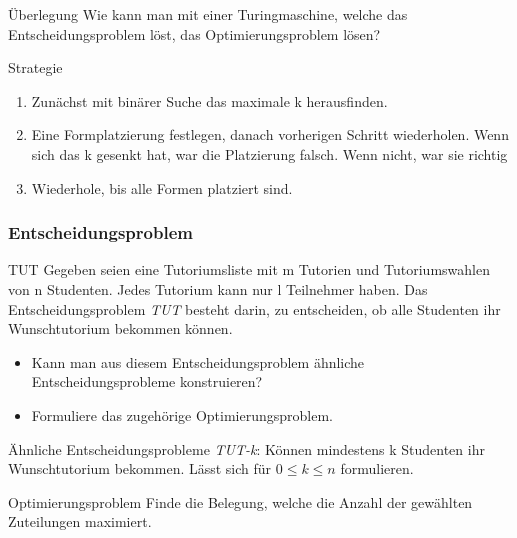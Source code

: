 \documentclass{beamer}
\begin{document}
{\begin{frame}
 \begin{block}{Überlegung}
  Wie kann man mit einer Turingmaschine, welche das Entscheidungsproblem löst, das Optimierungsproblem lösen?
 \end{block}
\begin{block}{Strategie}
 \begin{enumerate}
  \item Zunächst mit binärer Suche das maximale k herausfinden.
  \item Eine Formplatzierung festlegen, danach vorherigen Schritt wiederholen. Wenn sich das k gesenkt hat, war die Platzierung falsch. 
  Wenn nicht, war sie richtig
  \item Wiederhole, bis alle Formen platziert sind.
 \end{enumerate}
\end{block}
\end{frame}



\begin{frame}
 \frametitle{Entscheidungsproblem}
 \begin{block}{TUT}
  Gegeben seien eine Tutoriumsliste mit m Tutorien und Tutoriumswahlen von n Studenten. Jedes Tutorium kann nur l Teilnehmer haben.
 Das Entscheidungsproblem \textit{TUT} besteht darin, zu entscheiden, ob alle Studenten ihr Wunschtutorium bekommen können.
 \end{block}
 \begin{itemize}
  \item Kann man aus diesem Entscheidungsproblem ähnliche Entscheidungsprobleme konstruieren?
  \item Formuliere das zugehörige Optimierungsproblem.
 \end{itemize}
\end{frame}

\begin{frame}
 \begin{block}{Ähnliche Entscheidungsprobleme}
  \textit{TUT-k}: Können mindestens k Studenten ihr Wunschtutorium bekommen.
  Lässt sich für $0 \leq k \leq n$ formulieren.
 \end{block}
 \begin{block}{Optimierungsproblem}
  Finde die Belegung, welche die Anzahl der gewählten Zuteilungen maximiert.
 \end{block}
\end{frame}

}
\end{document}
